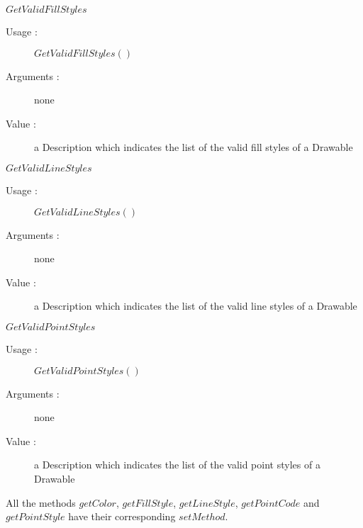 \begin{description}
\begin{description}
    \bigskip
  \item $GetValidFillStyles$
    \begin{description}
    \item[Usage :] $GetValidFillStyles()$
    \item[Arguments :] none
    \item[Value :] a Description which indicates the list of the valid fill styles of a Drawable
    \end{description}
    \bigskip
  \item $GetValidLineStyles$
    \begin{description}
    \item[Usage :] $GetValidLineStyles()$
    \item[Arguments :] none
    \item[Value :] a Description which indicates the list of the valid line styles of a Drawable
    \end{description}
    \bigskip
  \item $GetValidPointStyles$
    \begin{description}
    \item[Usage :] $GetValidPointStyles()$
    \item[Arguments :] none
    \item[Value :] a Description which indicates the list of the valid point  styles of a Drawable
    \end{description}
  \end{description}
\end{description}

All the methods $getColor$, $getFillStyle$, $getLineStyle$, $getPointCode$ and $getPointStyle$ have their corresponding $setMethod$.\\

